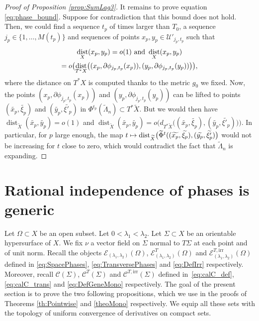 \documentclass[10pt]{amsart}
\let\mathcal\mathscr
\newcommand\mto{\mathchoice{\longmapsto}{\mapsto}{\mapsto}{\mapsto}}
\newcommand{\irr}{\mathrm{irr}}
\DeclareMathOperator{\dist}{dist}
\theoremstyle{plain}
\theoremstyle{definition}
\def\calC{\mathcal{C}}
\begin{document}
\begin{proof}[Proof of Proposition \ref{prop:SumLag3}]
It remains to prove equation \eqref{eq:phase_bound}. Suppose for contradiction that this bound does not hold. Then, we could find a sequence $t_p$ of times larger than $T_0$, a sequence $j_p\in \{1,\dots, M(t_p)\}$ and sequences of points $x_p, y_p\in \mathcal{U}'_{j_p, t_p}$ such that
\begin{multline*}
\dist_{X}(x_p,y_p)=o(1)\textup{ and }\dist_{X}(x_p,y_p)\\
= o\bigl(\dist_{T^*X} \bigl((x_p,\partial \phi_{j_p,t_p}(x_p)), (y_p, \partial \phi_{j_p,t_p}(y_p)) \bigr) \bigr),
\end{multline*}
where the distance on $T^*X$ is computed thanks to the metric $g_0$ we fixed. Now, the points $(x_p, \partial \phi_{j_p,t_p}(x_p))$ and $(y_p, \partial \phi_{j_p,t_p}(y_p))$ can be lifted to points $(\widetilde{x_p}, \widetilde{\xi_p})$ and $(\widetilde{y_p}, \widetilde{\xi'_p})$ in $\Phi^{t_p}(\widetilde{\Lambda}_n)\subset T^*\widetilde{X}$. But we would then have $\dist_{\widetilde{X}}(\widetilde{x_p},\widetilde{y_p})=o(1)$ and
$\dist_{\widetilde{X}}(\widetilde{x_p},\widetilde{y_p})=o \bigl(d_{T^*\widetilde{X}} \bigl((\widetilde{x_p}, \widetilde{\xi_p}), (\widetilde{y_p}, \widetilde{\xi'_p})\bigr)\bigr)$. In particular, for $p$ large enough, the map $t\mto \dist_{\widetilde{X}}\bigl(\widetilde{\Phi}^{t}((\widetilde{x_p}, \widetilde{\xi_p}),(\widetilde{y_p}, \widetilde{\xi'_p})\bigr)$ would not be increasing for $t$ close to zero, which would contradict the fact that $\widetilde{\Lambda}_n$ is expanding.
\end{proof}

\section{Rational independence of phases is generic}\label{sec:PhaseGen}

Let $\Omega\subset X$ be an open subset. Let $0<\lambda_1<\lambda_2$. Let $\Sigma\subset X$ be an orientable hypersurface of $X$. We fix $\nu$ a vector field on $\Sigma$ normal to $T\Sigma$ at each point and of unit norm. Recall the objects $\mathcal{E}_{(\lambda_1,\lambda_2)}(\Omega)$, $\mathcal{E}^T_{(\lambda_1,\lambda_2)}(\Omega)$ and $\mathcal{E}^{T,\irr}_{(\lambda_1,\lambda_2)}(\Omega)$ defined in \eqref{eq:SpacePhases}, \eqref{eq:TransversePhases} and \eqref{eq:DefIrr} respectively. Moreover, recall $\calC(\Sigma)$, $\calC^T(\Sigma)$ and $\mathcal{C}^{T,\irr}(\Sigma)$ defined in~\eqref{eq:calC_def}, \eqref{eq:calC_trans} and \eqref{eq:DefGeneMono} respectively. The goal of the present section is to prove the two following propositions, which we use in the proofs of Theorems \ref{th:Pointwise} and \ref{theoMono} respectively. We equip all these sets with the topology of uniform convergence of derivatives on compact sets.
\end{document}
